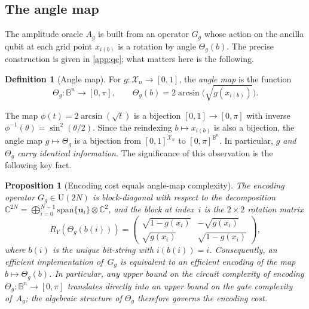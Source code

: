 \documentclass[12pt,a4paper]{article}
\theoremstyle{plain}
\newtheorem{proposition}[proposition]{Proposition}
\theoremstyle{definition}
\newtheorem{definition}[definition]{Definition}
\theoremstyle{remark}
\newcommand{\Thetag}{\Theta_g}
\begin{document}
\subsection{The angle map}

The amplitude oracle $A_g$ is built from an operator $G_g$ whose action
on the ancilla qubit at each grid point $x_{i(b)}$ is a rotation by
angle $\Thetag(b)$.
The precise construction is given in \cref{app:qc}; what matters here is
the following.

\begin{definition}[Angle map]
\label{def:angle_map}
For $g:\mathcal{X}_n\to[0,1]$, the \emph{angle map} is the function
\begin{equation}
  \Thetag:\mathbb{B}^n\to[0,\pi],
  \qquad
  \Thetag(b) = 2\arcsin\!\bigl(\sqrt{g(x_{i(b)})}\bigr).
  \label{eq:angle_map}
\end{equation}
\end{definition}

The map $\phi(t) = 2\arcsin(\sqrt{t})$ is a bijection $[0,1]\to[0,\pi]$
with inverse $\phi^{-1}(\theta) = \sin^2(\theta/2)$.
Since the reindexing $b\mapsto x_{i(b)}$ is also a bijection, the angle
map $g\mapsto\Thetag$ is a bijection from $[0,1]^{\mathcal{X}_n}$ to
$[0,\pi]^{\mathbb{B}^n}$.
In particular, \emph{$g$ and $\Thetag$ carry identical information}.
The significance of this observation is the following key fact.

\begin{proposition}[Encoding cost equals angle-map complexity]
\label{prop:encoding_cost}
The encoding operator $G_g \in \mathrm{U}(2N)$ is block-diagonal with
respect to the decomposition $\mathbb{C}^{2N} = \bigoplus_{i=0}^{N-1}
\mathrm{span}\{\mathbf{u}_i\} \otimes \mathbb{C}^2$,
and the block at index~$i$ is the $2\times 2$ rotation matrix
\begin{equation}
  R_Y(\Thetag(b(i)))
  = \begin{pmatrix}
      \sqrt{1-g(x_i)} & -\sqrt{g(x_i)} \\
      \sqrt{g(x_i)}   & \sqrt{1-g(x_i)}
    \end{pmatrix},
  \label{eq:G_block}
\end{equation}
where $b(i)$ is the unique bit-string with $i(b(i))=i$.
Consequently, an efficient implementation of~$G_g$ is equivalent to
an efficient encoding of the map $b\mapsto\Thetag(b)$.
In particular, any upper bound on the circuit complexity of encoding
$\Thetag:\mathbb{B}^n\to[0,\pi]$ translates directly into an upper
bound on the gate complexity of~$A_g$; the algebraic structure of
$\Thetag$ therefore governs the encoding cost.
\end{proposition}
\end{document}
